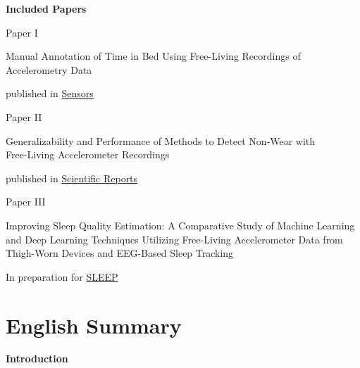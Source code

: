\documentclass[
  9pt,
]{scrbook}
\newcommand{\aftertocpagenum}{
   \cleardoublepage
   \pagenumbering{arabic}
 }
\renewcommand*\contentsname{Table of contents}
\newcommand\contentsname{Table of contents}
\begin{document}
\newpage

\textsf{\textbf{\Large{Included Papers}}}

\vspace{2cm}

\begin{center}

Paper I

\textsf{Manual Annotation of Time in Bed Using Free-Living Recordings of Accelerometry Data}

published in \href{https://doi.org/10.3390/s21248442}{Sensors}

\vspace{2cm}
Paper II

\textsf{Generalizability and Performance of Methods to Detect Non‑Wear with Free‑Living Accelerometer Recordings}

published in \href{https://doi.org/10.1038/s41598-023-29666-x}{Scientific Reports}

\vspace{2cm}
Paper III 

\textsf{Improving Sleep Quality Estimation: A Comparative Study of Machine Learning and Deep Learning Techniques Utilizing Free-Living Accelerometer Data from Thigh-Worn Devices and EEG-Based Sleep Tracking}

In preparation for \href{https://academic.oup.com/sleep}{SLEEP}

\end{center}\renewcommand*\contentsname{Table of contents}
{
\hypersetup{linkcolor=}
\setcounter{tocdepth}{2}
\tableofcontents
}
\listoffigures
\listoftables
\mainmatter
\aftertocpagenum

\hypertarget{english-summary}{%
\chapter{English Summary}\label{english-summary}}

\textbf{Introduction}
\end{document}
